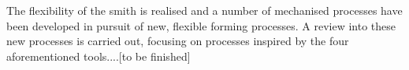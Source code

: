The flexibility of the smith is realised and a number of mechanised processes have been developed in pursuit of new, flexible forming processes. A review into these new processes is carried out, focusing on processes inspired by the four aforementioned tools....[to be finished]






\renewcommand{\bibname}{References}
\clearpage
%

%


